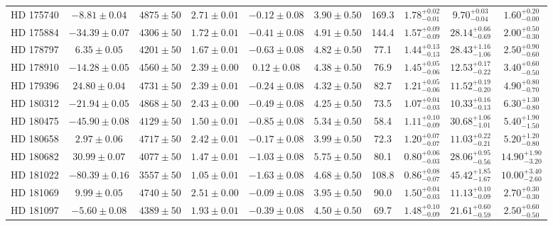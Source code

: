 \begin{table*}
\begin{tabular}{cccccccccc}
HD 175740 & $-8.81 \pm 0.04$ & $4875 \pm 50$ & $2.71 \pm 0.01$ & $-0.12 \pm 0.08$ & $3.90 \pm 0.50$ & 169.3 & $1.78^{+0.02}_{-0.01}$ & $9.70^{+0.03}_{-0.04}$ & $1.60^{+0.20}_{-0.00}$ \\
HD 175884 & $-34.39 \pm 0.07$ & $4306 \pm 50$ & $1.72 \pm 0.01$ & $-0.41 \pm 0.08$ & $4.91 \pm 0.50$ & 144.4 & $1.57^{+0.09}_{-0.09}$ & $28.14^{+0.66}_{-0.69}$ & $2.00^{+0.50}_{-0.30}$ \\
HD 178797 & $6.35 \pm 0.05$ & $4201 \pm 50$ & $1.67 \pm 0.01$ & $-0.63 \pm 0.08$ & $4.82 \pm 0.50$ & 77.1 & $1.44^{+0.13}_{-0.13}$ & $28.43^{+1.16}_{-1.06}$ & $2.50^{+0.90}_{-0.60}$ \\
HD 178910 & $-14.28 \pm 0.05$ & $4560 \pm 50$ & $2.39 \pm 0.00$ & $0.12 \pm 0.08$ & $4.38 \pm 0.50$ & 76.9 & $1.45^{+0.05}_{-0.06}$ & $12.53^{+0.17}_{-0.22}$ & $3.40^{+0.60}_{-0.50}$ \\
HD 179396 & $24.80 \pm 0.04$ & $4731 \pm 50$ & $2.39 \pm 0.01$ & $-0.24 \pm 0.08$ & $4.32 \pm 0.50$ & 82.7 & $1.21^{+0.05}_{-0.06}$ & $11.52^{+0.19}_{-0.20}$ & $4.90^{+0.80}_{-0.70}$ \\
HD 180312 & $-21.94 \pm 0.05$ & $4868 \pm 50$ & $2.43 \pm 0.00$ & $-0.49 \pm 0.08$ & $4.25 \pm 0.50$ & 73.5 & $1.07^{+0.04}_{-0.03}$ & $10.33^{+0.16}_{-0.13}$ & $6.30^{+1.30}_{-0.80}$ \\
HD 180475 & $-45.90 \pm 0.08$ & $4129 \pm 50$ & $1.50 \pm 0.01$ & $-0.85 \pm 0.08$ & $5.34 \pm 0.50$ & 58.4 & $1.11^{+0.10}_{-0.09}$ & $30.68^{+1.06}_{-1.01}$ & $5.40^{+1.90}_{-1.50}$ \\
HD 180658 & $2.97 \pm 0.06$ & $4717 \pm 50$ & $2.42 \pm 0.01$ & $-0.17 \pm 0.08$ & $3.99 \pm 0.50$ & 72.3 & $1.20^{+0.07}_{-0.07}$ & $11.03^{+0.22}_{-0.21}$ & $5.20^{+1.20}_{-0.80}$ \\
HD 180682 & $30.99 \pm 0.07$ & $4077 \pm 50$ & $1.47 \pm 0.01$ & $-1.03 \pm 0.08$ & $5.75 \pm 0.50$ & 80.1 & $0.80^{+0.06}_{-0.03}$ & $28.06^{+0.95}_{-0.56}$ & $14.90^{+1.90}_{-3.20}$ \\
HD 181022 & $-80.39 \pm 0.16$ & $3557 \pm 50$ & $1.05 \pm 0.01$ & $-1.63 \pm 0.08$ & $4.68 \pm 0.50$ & 108.8 & $0.86^{+0.08}_{-0.07}$ & $45.42^{+1.85}_{-1.67}$ & $10.00^{+3.40}_{-2.60}$ \\
HD 181069 & $9.99 \pm 0.05$ & $4740 \pm 50$ & $2.51 \pm 0.00$ & $-0.09 \pm 0.08$ & $3.95 \pm 0.50$ & 90.0 & $1.50^{+0.04}_{-0.03}$ & $11.13^{+0.10}_{-0.09}$ & $2.70^{+0.30}_{-0.30}$ \\
HD 181097 & $-5.60 \pm 0.08$ & $4389 \pm 50$ & $1.93 \pm 0.01$ & $-0.39 \pm 0.08$ & $4.50 \pm 0.50$ & 69.7 & $1.48^{+0.10}_{-0.09}$ & $21.61^{+0.60}_{-0.59}$ & $2.50^{+0.60}_{-0.50}$ \\

\end{tabular}
\end{table*}
